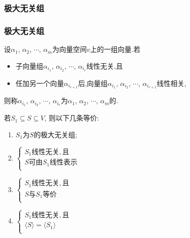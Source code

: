 \subsubsection{极大无关组}
\begin{frame}\frametitle{极大无关组}

\pp
\begin{definition}[极大线性无关组]
设$\alpha_1$, $\alpha_2$, $\cdots$, $\alpha_m$为向量空间$v$上的一组向量.\pp 若
\begin{itemize}
\item 子向量组$\alpha_{i_1}$, $\alpha_{i_2}$, $\cdots$, $\alpha_{i_r}$线性无关,且\pp
\item 任加另一个向量$\alpha_{i_{r+1}}$后,向量组$\alpha_{i_1}$, $\alpha_{i_2}$, $\cdots$, $\alpha_{i_{r+1}}$线性相关,
\end{itemize}
\pp
则称$\alpha_{i_1}$, $\alpha_{i_2}$, $\cdots$, $\alpha_{i_r}$为$\alpha_1$, $\alpha_2$, $\cdots$, $\alpha_m$的.
\end{definition}
\pp
\begin{theorem}
若$S_1\subseteq S\subseteq V$, 则以下几条等价:\pp
\begin{enumerate}
\item $S_1$为$S$的极大无关组;\pp
\item $\left\{\begin{array}{l}
\text{$S_1$线性无关},且\\
\text{$S$可由$S_1$线性表示}\\
\end{array}\right.$\pp
\item $\left\{\begin{array}{l}
\text{$S_1$线性无关},且\\
\text{$S$与$S_1$等价}\\
\end{array}\right.$\pp
\item $\left\{\begin{array}{l}
\text{$S_1$线性无关},且\\
\langle S\rangle=\langle S_1\rangle\\
\end{array}\right.$
\end{enumerate}
\end{theorem}
\end{frame}





